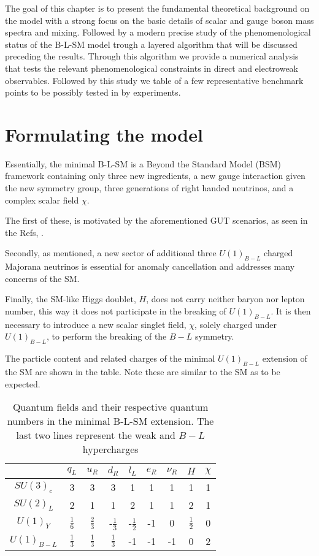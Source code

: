 The goal of this chapter is to present the fundamental theoretical background on the model with a strong focus on the basic details of scalar and gauge boson mass spectra and mixing. Followed by a modern precise study of the phenomenological status of the B-L-SM model trough a layered algorithm that will be discussed preceding the results. Through this algorithm we provide a numerical analysis that tests the relevant phenomenological constraints in direct and electroweak observables. Followed by this study we table of a few representative benchmark points to be possibly tested in by experiments. 

\section{Formulating the model}

Essentially, the minimal B-L-SM is a Beyond the Standard Model (BSM) framework containing only three new ingredients, a new gauge interaction given the new symmetry group, three generations of right handed neutrinos, and a complex scalar field $\chi$. 

The first of these, is motivated by the aforementioned GUT scenarios, as seen in the Refs, \cite{Chanowitz:1977ye,Fritzsch:1974nn,Georgi:1978fu,Georgi:1979dq,Georgi:1979ga,Achiman:1978vg,Gursey:1975ki,Gursey:1981kf}. 

Secondly, as mentioned, a new sector of additional three $U(1)_{B-L}$ charged Majorana neutrinos is essential for anomaly cancellation and addresses many concerns of the SM. 

Finally, the SM-like Higgs doublet, $H$, does not carry neither baryon nor lepton number, this way it does not participate in the breaking of $U(1)_{B-L}$. It is then necessary to introduce a new scalar singlet field, $\chi$, solely charged under $U(1)_{B-L}$, to perform the breaking of the $B-L$ symmetry.

The particle content and related charges of the minimal $U(1)_{B-L}$ extension of the SM are shown in the table. Note these are similar to the SM as to be expected. 

\begin{table}[H]
\centering
\begin{tabular}{|c|c|c|c|c|c|c|c|c|}
\hline
  & $q_L$  & $u_R$ & $d_R$ & $l_L$  & $e_R$ & $\nu_R$  &  $H$  & $\chi$  \\ \hline
 $SU(3)_c$& 3 & 3 & 3 & 1 & 1 & 1 & 1  & 1  \\
 $SU(2)_L$& 2  & 1 & 1 & 2 & 1 & 1 & 2  & 1 \\
$U(1)_Y$ & $\frac{1}{6}$ & $\frac{2}{3}$  & -$\frac{1}{3}$  & -$\frac{1}{2}$ & -1 & 0 & $\frac{1}{2}$ & 0 \\
$U(1)_{B-L}$ & $\frac{1}{3}$ & $\frac{1}{3}$ & $\frac{1}{3}$  & -1  & -1 &-1  & 0 & 2  \\ \hline 
\end{tabular}
\caption{Quantum fields and their respective quantum numbers in the minimal B-L-SM extension. The last two lines represent the weak and $B-L$ hypercharges}
\label{tab:charges}
\end{table} 

